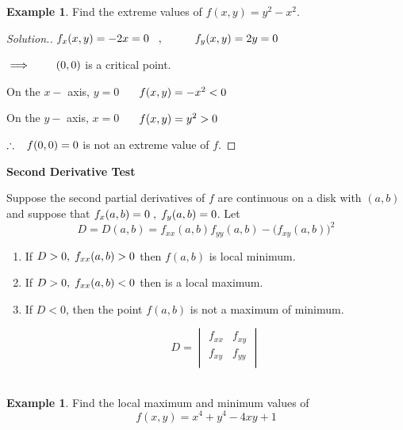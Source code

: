 \documentclass[11pt,a4paper]{article}
\theoremstyle{definition}
\newtheorem{exa}[thm]{Example}
\newenvironment{solution}
  {\renewcommand{\qedsymbol}{}\begin{proof}[\textit{Solution}.]}
  {\end{proof}}
\newcommand{\subhead}[1]{%
  \par\medskip\noindent\textbf{#1}\par\nobreak\smallskip}
\begin{document}
\begin{exa}


Find the extreme values of $f(x,y) = y^2 - x^2$.
\end{exa}


\begin{solution}


$f_x(x,y) = -2x =0\hspace{0.3cm},\hspace{1cm}  f_y(x,y) = 2y =0$


$\implies \hspace{0.7cm} (0,0)$ is a critical point.


On the $x-$ axis, $y=0$ $\hspace{0.5cm} f(x,y) = -x^2 <0$


On the $y-$ axis, $x=0$ $\hspace{0.5cm} f(x,y) = y^2> 0$


$\therefore\hspace{0.3cm} f(0,0) = 0$ is not an extreme value of $f$.
\end{solution}


\subhead{Second Derivative Test}


Suppose the second partial derivatives of $f$ are continuous on a disk with $(a,b)$ and suppose that $f_x(a,b)=0\hspace{0.1cm},\hspace{0.1cm} f_y(a,b) =0$. Let $$D = D(a,b) = f_{xx}(a,b)f_{yy}(a,b) -\big(f_{xy}(a,b)\big)^2$$  
\begin{enumerate}
\item If $D> 0,\hspace{0.1cm} f_{xx}(a,b)>0$ then $f(a,b)$ is local minimum.

\item If $D>0,\hspace{0.1cm} f_{xx}(a,b)<0$ then is a local maximum.

\item If $D<0$, then the point $f(a,b)$ is not a maximum of minimum.

$$ D = \begin{vmatrix}
f_{xx} & f_{xy}\\
f_{xy} & f_{yy}\\
\end{vmatrix}$$\\
\end{enumerate}

\begin{exa}


Find the local maximum and minimum values of $$f(x,y) = x^4 + y^4 - 4xy + 1$$
\end{exa}
\end{document}
